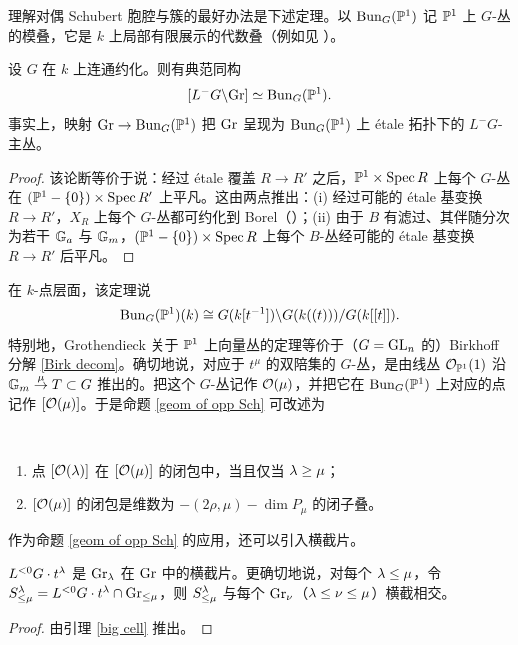 理解对偶 Schubert 胞腔与簇的最好办法是下述定理。以 ${\operatorname{Bun}}_G({\mathbb P}^1)$ 记 ${\mathbb P}^1$ 上 $G$-丛的模叠，它是 $k$ 上局部有限展示的代数叠（例如见 \cite{So}）。

\begin{thm}\label{uniformization for P1}
设 $G$ 在 $k$ 上连通约化。则有典范同构
\[ [L^-G\backslash {\operatorname{Gr}}]\simeq {\operatorname{Bun}}_G({\mathbb P}^1).\]
事实上，映射 ${\operatorname{Gr}}\to {\operatorname{Bun}}_G({\mathbb P}^1)$ 把 ${\operatorname{Gr}}$ 呈现为 ${\operatorname{Bun}}_G({\mathbb P}^1)$ 上 \'etale 拓扑下的 $L^-G$-主丛。
\end{thm}

\begin{proof}
该论断等价于说：经过 \'etale 覆盖 $R\to R'$ 之后，${\mathbb P}^1\times \operatorname{Spec} R$ 上每个 $G$-丛在 $({\mathbb P}^1-\{0\})\times \operatorname{Spec} R'$ 上平凡。这由两点推出：(i) 经过可能的 \'etale 基变换 $R\to R'$，$X_R$ 上每个 $G$-丛都可约化到 Borel（\cite[Theorem 1]{DS}）；(ii) 由于 $B$ 有滤过、其伴随分次为若干 ${\mathbb G}_a$ 与 ${\mathbb G}_m$，$({\mathbb P}^1-\{0\})\times \operatorname{Spec} R$ 上每个 $B$-丛经可能的 \'etale 基变换 $R\to R'$ 后平凡。
\end{proof}

在 $k$-点层面，该定理说
\[ {\operatorname{Bun}}_{G}({\mathbb P}^1)(k)\cong G(k[t^{-1}])\backslash G(k((t)))/ G(k[[t]]).\]
特别地，Grothendieck 关于 ${\mathbb P}^1$ 上向量丛的定理等价于（$G={\operatorname{GL}}_n$ 的）Birkhoff 分解 \eqref{Birk decom}。确切地说，对应于 $t^\mu$ 的双陪集的 $G$-丛，是由线丛 ${\mathcal O}_{{\mathbb P}^1}(1)$ 沿 ${\mathbb G}_m\stackrel{\mu}{\to}T\subset G$ 推出的。把这个 $G$-丛记作 ${\mathcal O}(\mu)$，并把它在 ${\operatorname{Bun}}_G({\mathbb P}^1)$ 上对应的点记作 $[{\mathcal O}(\mu)]$。于是命题 \ref{geom of opp Sch} 可改述为

\begin{prop}\label{geom of strata}~
\begin{enumerate}
\item 点 $[{\mathcal O}({\lambda})]$ 在 $[{\mathcal O}(\mu)]$ 的闭包中，当且仅当 ${\lambda}\geq \mu$；
\item $[{\mathcal O}(\mu)]$ 的闭包是维数为 $-(2\rho,\mu)-\dim P_\mu$ 的闭子叠。
\end{enumerate}
\end{prop}

作为命题 \ref{geom of opp Sch} 的应用，还可以引入横截片。

\begin{prop}
$L^{<0}G\cdot t^{\lambda}$ 是 ${\operatorname{Gr}}_{\lambda}$ 在 ${\operatorname{Gr}}$ 中的横截片。更确切地说，对每个 ${\lambda}\leq \mu$，令 $S^{\lambda}_{\leq \mu}=L^{<0}G\cdot t^{\lambda}\cap {\operatorname{Gr}}_{\leq \mu}$，则 $S^{\lambda}_{\leq \mu}$ 与每个 ${\operatorname{Gr}}_\nu$（${\lambda}\leq \nu\leq \mu$）横截相交。
\end{prop}

\begin{proof}由引理 \ref{big cell} 推出。
\end{proof}

